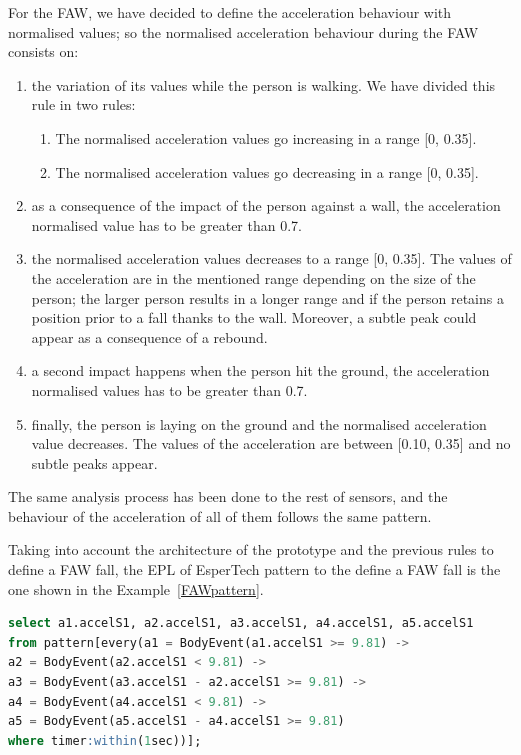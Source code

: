 \documentclass[review]{elsarticle}
\begin{document}
For the FAW, we have decided to define the acceleration behaviour with normalised values; so the 
normalised acceleration behaviour during the FAW consists on:
\begin{enumerate}
 \item the variation of its values while the person is walking. We have divided this rule in two rules:
 \begin{enumerate}
  \item The normalised acceleration values go increasing in a range [0, 0.35].
  \item The normalised acceleration values go decreasing in a range [0, 0.35].
 \end{enumerate}
 \item as a consequence of the impact of the person against a wall, the acceleration normalised value 
 has to be greater than 0.7.
 \item the normalised acceleration values decreases to a range [0, 0.35]. The values of the acceleration are 
 in the mentioned range depending on the size of the person; the larger person results in a longer range 
 and if the person retains a position prior to a fall thanks to the wall. Moreover, a subtle peak could 
 appear as a consequence of a rebound.
 \item a second impact happens when the person hit the ground, the acceleration normalised values has to 
 be greater than 0.7.
 \item finally, the person is laying on the ground and the normalised acceleration value decreases. The 
 values of the acceleration are between [0.10, 0.35] and no subtle peaks appear. 
\end{enumerate}

The same analysis process has been done to the rest of sensors, and the behaviour of the acceleration of all of 
them follows the same pattern.

Taking into account the architecture of the prototype and the previous rules to define a FAW fall, the EPL of EsperTech
pattern to the define a FAW fall is the one shown in the Example~\ref{FAWpattern}.

\begin{lstlisting}[basicstyle=\ttfamily\footnotesize,language=SQL, mathescape,caption=FAW pattern,label=FAWpattern]
select a1.accelS1, a2.accelS1, a3.accelS1, a4.accelS1, a5.accelS1 
from pattern[every(a1 = BodyEvent(a1.accelS1 >= 9.81) -> 
a2 = BodyEvent(a2.accelS1 < 9.81) ->
a3 = BodyEvent(a3.accelS1 - a2.accelS1 >= 9.81) ->
a4 = BodyEvent(a4.accelS1 < 9.81) ->
a5 = BodyEvent(a5.accelS1 - a4.accelS1 >= 9.81) 
where timer:within(1sec))];
\end{lstlisting}
\end{document}
